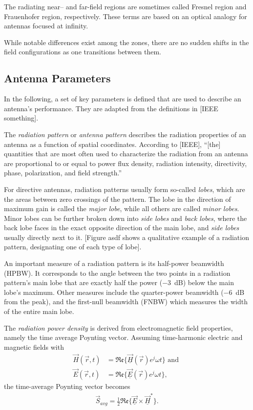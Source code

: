The radiating near-- and far-field regions are sometimes called Fresnel region and Frauenhofer region, respectively.
These terms are based on an optical analogy for antennas focused at infinity.

While notable differences exist among the zones,
there are no sudden shifts in the field configurations as one transitions between them. 

\subsection{Antenna Parameters}
In the following, a set of key parameters is defined that are used to describe an antenna's performance.
They are adapted from the definitions in [IEEE something].

The \emph{radiation pattern} or \emph{antenna pattern} 
describes the radiation properties of an antenna as a function of spatial coordinates.
According to [IEEE], ``[the] quantities that are most often used to characterize the radiation from an antenna
are proportional to or equal to power flux density,
radiation intensity, directivity, phase, polarization, and field strength.''

For directive antennas, radiation patterns usually form so-called \emph{lobes}, 
which are the areas between zero crossings of the pattern. 
The lobe in the direction of maximum gain is called the \emph{major lobe},
while all others are called \emph{minor lobes}.
Minor lobes can be further broken down into \emph{side lobes} and \emph{back lobes},
where the back lobe faces in the exact opposite direction of the main lobe,
and \emph{side lobes} usually directly next to it.
[Figure asdf shows a qualitative example of a radiation pattern,
designating one of each type of lobe].

An important measure of a radiation pattern is its half-power beamwidth (HPBW).
It corresponds to the angle between the two points 
in a radiation pattern's main lobe that are exactly half the power (\SI{-3}{\dB})
below the main lobe's maximum. Other measures include the quarter-power beamwidth
(\SI{-6}{\dB} from the peak), and the first-null beamwidth (FNBW) which measures the width of the entire main lobe.

The \emph{radiation power density} is derived from electromagnetic field properties,
namely the time average Poynting vector.
Assuming time-harmonic electric and magnetic fields with 
\begin{align}
    \vec H(\vec r, t) &= \mathfrak{Re}\{\vec \underline{H}(\vec{r}) e^j\omega t\} \text{ and } \\
    \vec E(\vec r, t) &= \mathfrak{Re}\{\vec \underline{E}(\vec{r}) e^j\omega t\},
\end{align}
the time-average Poynting vector becomes
\begin{align}
    \vec S_{avg} = \frac{1}{2} \mathfrak{Re}\{ \vec\underline E \times \vec\underline H^* \}.
\end{align}

